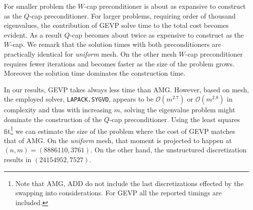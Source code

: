 \documentclass[10pt, a4paper]{article}
\begin{document}
For smaller problem the $W$-cap preconditioner is about as expansive to construct 
as the $Q$-cap preconditioner. For larger problems, requiring order of thousand
eigenvalues, the contribution of GEVP solve time to the total cost becomes
evident. As a result $Q$-cap becomes about twice as expensive to construct as the 
$W$-cap. We remark that the solution times with both preconditioners are
practically identical for \textit{uniform} mesh. On the other mesh $W$-cap
preconditioner requires fewer iterations and becomes faster as the size of the 
problem grows. Moreover the solution time dominates the construction time.

In our results, GEVP takes always less time than AMG. However, based on mesh, 
the employed solver, \texttt{LAPACK.SYGVD}, appears to be $\mathcal{O}(m^{2.7})$
or $\mathcal{O}(m^{2.8})$ in complexity and thus with increasing $m$, solving 
the eigenvalue problem might dominate the construction of the $Q$-cap preconditioner.
Using the least squares fit\footnote{Note that AMG, ADD do not include the last
discretizations effected by the swapping into considerations. For GEVP all the
reported timings are included.} we can estimate the size of the problem where the
cost of GEVP matches that of AMG. On the \textit{uniform} mesh, that moment is
projected to happen at $(n, m)=(8886110, 3761)$. On the other hand, the
unstructured discretization results in $(24154952, 7527)$. 
\end{document}
